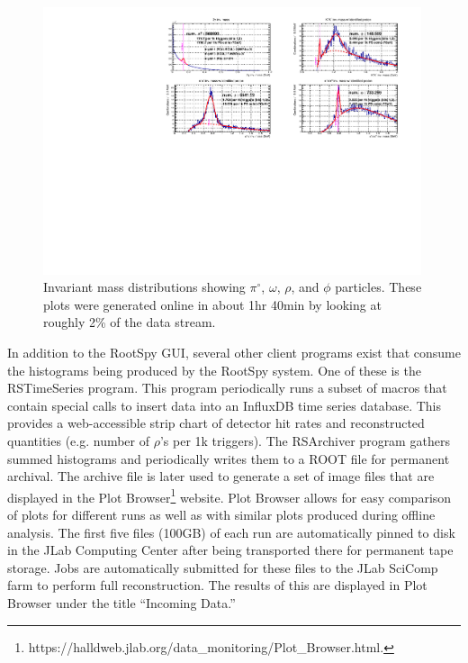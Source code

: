 \begin{figure}[tbp]
\begin{center}
\includegraphics[width=0.99\textwidth, clip,trim=0.6cm 0.0cm 1.1cm 0.0cm]{figures/online_monitoring_PID.pdf}
\caption{\label{fig:online_monitoring_PID}Invariant mass distributions showing $\pi^\circ$, $\omega$, $\rho$, and $\phi$ particles. These plots were generated online in about 1hr 40min by looking at roughly 2\% of the data stream.}   
\end{center}  
\end{figure}

In addition to the RootSpy GUI, several other client programs exist that consume the histograms being produced by the RootSpy system. One of these is the RSTimeSeries program. This program periodically runs a subset of macros that contain special calls to insert data into an InfluxDB time series database. This provides a web-accessible strip chart of detector hit rates and reconstructed quantities (e.g. number of $\rho$'s per 1k triggers). The RSArchiver program gathers summed histograms and periodically writes them to a ROOT file for permanent archival. The archive file is later used to generate a set of image files that are displayed in the Plot Browser\footnote{https://halldweb.jlab.org/data\_monitoring/Plot\_Browser.html.} website. Plot Browser allows for easy comparison of plots for different runs as well as with similar plots produced during offline analysis. The first five files (100GB) of each run are automatically pinned to disk in the JLab Computing Center after being transported there for permanent tape storage. Jobs are automatically submitted for these files to the JLab SciComp farm to perform full reconstruction. The results of this are displayed in Plot Browser under the title ``Incoming Data.''


